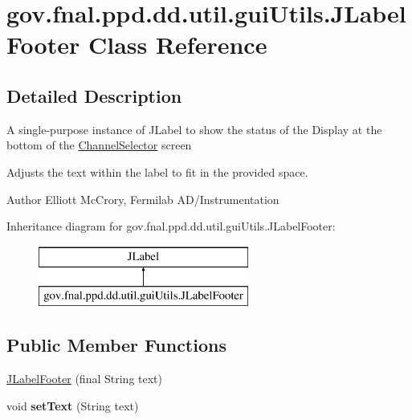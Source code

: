 \hypertarget{classgov_1_1fnal_1_1ppd_1_1dd_1_1util_1_1guiUtils_1_1JLabelFooter}{\section{gov.\-fnal.\-ppd.\-dd.\-util.\-gui\-Utils.\-J\-Label\-Footer Class Reference}
\label{classgov_1_1fnal_1_1ppd_1_1dd_1_1util_1_1guiUtils_1_1JLabelFooter}
}


\subsection{Detailed Description}
A single-\/purpose instance of J\-Label to show the status of the Display at the bottom of the \hyperlink{classgov_1_1fnal_1_1ppd_1_1dd_1_1ChannelSelector}{Channel\-Selector} screen

Adjusts the text within the label to fit in the provided space.

\begin{DoxyAuthor}{Author}
Elliott Mc\-Crory, Fermilab A\-D/\-Instrumentation 
\end{DoxyAuthor}
Inheritance diagram for gov.\-fnal.\-ppd.\-dd.\-util.\-gui\-Utils.\-J\-Label\-Footer\-:\begin{figure}[H]
\begin{center}
\leavevmode
\includegraphics[height=2.000000cm]{classgov_1_1fnal_1_1ppd_1_1dd_1_1util_1_1guiUtils_1_1JLabelFooter}
\end{center}
\end{figure}
\subsection*{Public Member Functions}
\begin{DoxyCompactItemize}
\item 
\hyperlink{classgov_1_1fnal_1_1ppd_1_1dd_1_1util_1_1guiUtils_1_1JLabelFooter_aa9d75e5757c4c2e8625c7c2cf54bef17}{J\-Label\-Footer} (final String text)
\item 
\hypertarget{classgov_1_1fnal_1_1ppd_1_1dd_1_1util_1_1guiUtils_1_1JLabelFooter_ab0c1cc40ed25b7af9eea15b8e3f34ac6}{void {\bfseries set\-Text} (String text)}\label{classgov_1_1fnal_1_1ppd_1_1dd_1_1util_1_1guiUtils_1_1JLabelFooter_ab0c1cc40ed25b7af9eea15b8e3f34ac6}

\end{DoxyCompactItemize}


